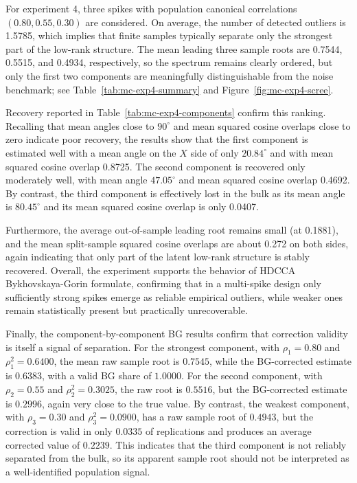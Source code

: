 \documentclass[12pt]{report} %
\begin{document}
For experiment 4, three spikes with population canonical correlations $(0.80, 0.55, 0.30)$ are considered.
On average, the number of detected outliers is 1.5785, which implies that finite samples 
typically separate only the strongest part of the low-rank structure. The mean leading three 
sample roots are 0.7544, 0.5515, and 0.4934, respectively, so the spectrum remains clearly 
ordered, but only the first two components are meaningfully distinguishable from the noise benchmark; see 
Table~\ref{tab:mc-exp4-summary} and Figure~\ref{fig:mc-exp4-scree}.

Recovery reported in Table~\ref{tab:mc-exp4-components} confirm this ranking. Recalling that 
mean angles close to $90^\circ$ and mean squared cosine overlaps close to zero indicate poor 
recovery, the results show that the first component is estimated well with a mean angle on 
the $X$ side of only $20.84^\circ$ and with mean squared cosine overlap 0.8725. The second 
component is recovered only moderately well, with mean angle $47.05^\circ$ and mean squared 
cosine overlap 0.4692. By contrast, the third component is effectively lost in the bulk as
its mean angle is $80.45^\circ$ and its mean squared cosine overlap is only 0.0407. 

Furthermore, the average out-of-sample leading root remains small (at 0.1881), and the mean 
split-sample squared cosine overlaps are about 0.272 on both sides, again indicating that 
only part of the latent low-rank structure is stably recovered. Overall, the experiment 
supports the behavior of HDCCA Bykhovskaya-Gorin formulate, confirming that in a multi-spike 
design only sufficiently strong spikes emerge as reliable empirical outliers, while weaker 
ones remain statistically present but practically unrecoverable.

Finally, the component-by-component BG results confirm that correction validity is 
itself a signal of separation. For the strongest component, with \(\rho_1=0.80\) and 
\(\rho_1^2=0.6400\), the mean raw sample root is \(0.7545\), while the BG-corrected 
estimate is \(0.6383\), with a valid BG share of \(1.0000\). For the second component, 
with \(\rho_2=0.55\) and \(\rho_2^2=0.3025\), the raw root is \(0.5516\), but the 
BG-corrected estimate is \(0.2996\), again very close to the true value. 
By contrast, the weakest component, with \(\rho_3=0.30\) 
and \(\rho_3^2=0.0900\), has a raw sample root of \(0.4943\), but the correction is valid 
in only \(0.0335\) of replications and produces an average corrected value of \(0.2239\). 
This indicates that the third component is not reliably separated from the bulk, so its 
apparent sample root should not be interpreted as a well-identified population signal.
\end{document}
